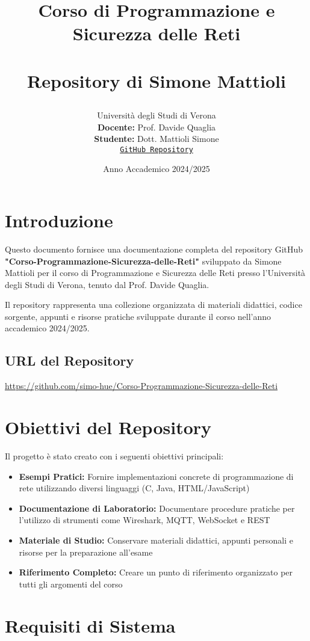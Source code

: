 \documentclass[12pt,a4paper]{article}
\title{
    \vspace{-2cm}
    \begin{tcolorbox}[colback=blue!5!white,colframe=blue!75!black,title=Documentazione Della Repository GitHub]
        \Huge \textbf{Corso di Programmazione e\\Sicurezza delle Reti}\\\\
        \vspace{0.5cm}
        \normalsize Repository di Simone Mattioli
    \end{tcolorbox}
}
\author{
    Università degli Studi di Verona\\
    \vspace{1cm}
    \textbf{Docente:} Prof. Davide Quaglia\\
    \textbf{Studente:} Dott. Mattioli Simone\\
    \vspace{1cm}
    \href{https://github.com/simo-hue/Corso-Programmazione-Sicurezza-delle-Reti}{\texttt{GitHub Repository}}
}
\date{Anno Accademico 2024/2025}
\begin{document}
\maketitle
\newpage

\tableofcontents
\newpage

\section{Introduzione}

Questo documento fornisce una documentazione completa del repository GitHub \textbf{"Corso-Programmazione-Sicurezza-delle-Reti"} sviluppato da Simone Mattioli per il corso di Programmazione e Sicurezza delle Reti presso l'Università degli Studi di Verona, tenuto dal Prof. Davide Quaglia.

Il repository rappresenta una collezione organizzata di materiali didattici, codice sorgente, appunti e risorse pratiche sviluppate durante il corso nell'anno accademico 2024/2025.

\subsection{URL del Repository}
\url{https://github.com/simo-hue/Corso-Programmazione-Sicurezza-delle-Reti}

\section{Obiettivi del Repository}

Il progetto è stato creato con i seguenti obiettivi principali:

\begin{itemize}
    \item \textbf{Esempi Pratici:} Fornire implementazioni concrete di programmazione di rete utilizzando diversi linguaggi (C, Java, HTML/JavaScript)
    \item \textbf{Documentazione di Laboratorio:} Documentare procedure pratiche per l'utilizzo di strumenti come Wireshark, MQTT, WebSocket e REST
    \item \textbf{Materiale di Studio:} Conservare materiali didattici, appunti personali e risorse per la preparazione all'esame
    \item \textbf{Riferimento Completo:} Creare un punto di riferimento organizzato per tutti gli argomenti del corso
\end{itemize}

\section{Requisiti di Sistema}
\end{document}
